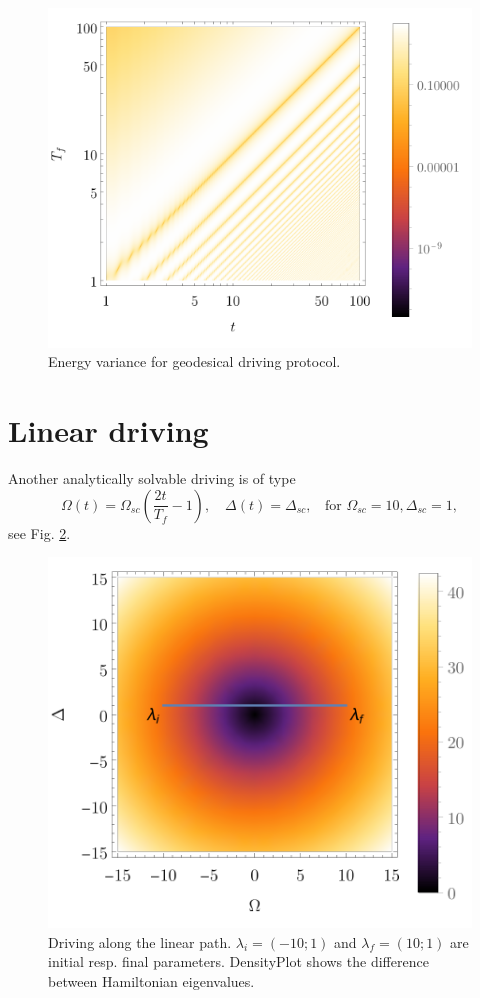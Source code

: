 \begin{figure}[H]
    \centering
    \includegraphics[scale=1.2]{../img/densVar.pdf}
    \caption{Energy variance for geodesical driving protocol.}
    \label{fig:densVar}
\end{figure}

\newpage 
\section{Linear driving}
Another analytically solvable driving is of type 
\begin{equation}
    \Omega(t)=\Omega_{sc}\left(\frac{2t}{T_f}-1\right),\quad \Delta(t)=\Delta_{sc}, \;\;\text{ for } \Omega_{sc}=10, \Delta_{sc}=1,
    \label{eq:linearDrivingdef}
\end{equation}
see Fig. \ref{fig:driving}. 
\begin{figure}[H]
    \centering
    \includegraphics[scale=1.2]{../img/drivingLin.pdf}
    \caption{Driving along the linear path. $\lambda_i=(-10;1)$ and $\lambda_f=(10;1)$ are initial resp. final parameters. DensityPlot shows the difference between Hamiltonian eigenvalues.}
    \label{fig:driving}
\end{figure}

